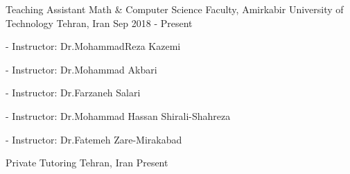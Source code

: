 \documentclass[11pt, a4paper]{awesome-cv}
\begin{document}
\begin{cventries}
	
	\cventry
	{Teaching Assistant} %
	{Math \& Computer Science Faculty, Amirkabir University of Technology} %
	{Tehran, Iran} %
	{Sep 2018 - Present} %
	{
		\begin{cvitems} %
			\item { - Instructor: Dr.MohammadReza Kazemi}
			\item { - Instructor: Dr.Mohammad Akbari}
			\item { - Instructor: Dr.Farzaneh Salari}
			\item { - Instructor: Dr.Mohammad Hassan Shirali-Shahreza }
			\item { - Instructor: Dr.Fatemeh Zare-Mirakabad}
		\end{cvitems}
	}
	
		\cventry
	{Private Tutoring} %
	{ } %
	{Tehran, Iran} %
	{Present} %
	{
		\begin{cvitems} %
			\item {}
			\item {}
			\item {}
			\item {}
			\item {}
		\end{cvitems}
	}



\end{cventries}
\end{document}
